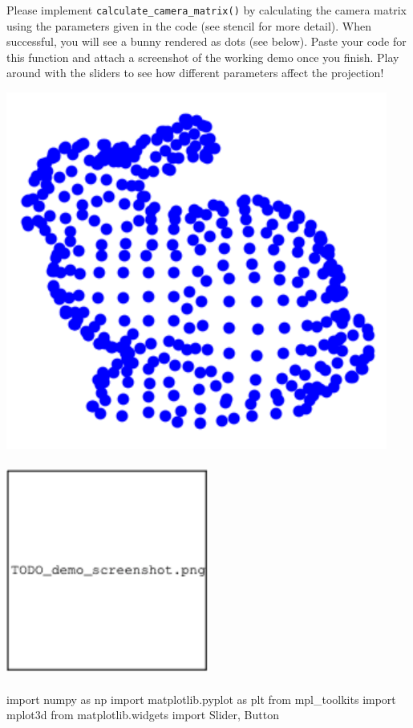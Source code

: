 \begin{enumerate}[(a)]
\begin{tcolorbox}[colback=orange!5!white,colframe=orange!75!black]
Please implement \texttt{calculate\_camera\_matrix()} by calculating the camera matrix using the parameters given in the code (see stencil for more detail). When successful, you will see a bunny rendered as dots (see below). Paste your code for this function and attach a screenshot of the working demo once you finish. Play around with the sliders to see how different parameters affect the projection!
\end{tcolorbox}

\includegraphics[width=0.5\linewidth]{images/bunny.png}

\begin{tcolorbox}[enhanced jigsaw,breakable,pad at break*=1mm,colback=white!5!white,colframe=green!75!black,height fixed for=all]

    \includegraphics[width=0.5\textwidth,height=7cm,keepaspectratio]{images/TODO_demo_screenshot.png}


    \begin{python}
import numpy as np
import matplotlib.pyplot as plt
from mpl_toolkits import mplot3d
from matplotlib.widgets import Slider, Button


\end{python}
\end{tcolorbox}
\end{enumerate}
